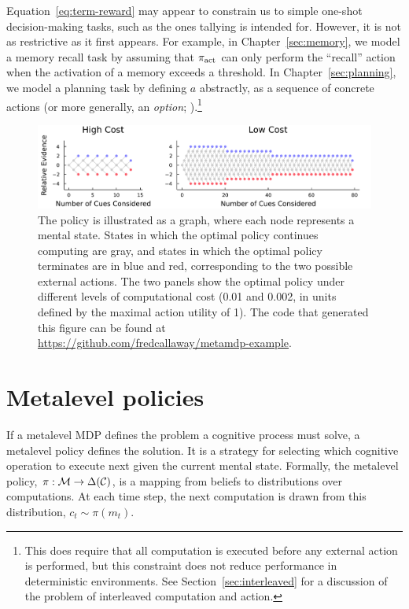 Equation~\ref{eq:term-reward} may appear to constrain us to simple one-shot decision-making tasks, such as the ones tallying is intended for. However, it is not as restrictive as it first appears. For example, in Chapter~\ref{sec:memory}, we model a memory recall task by assuming that $\pi_{\text{act}}$ can only perform the ``recall'' action when the activation of a memory exceeds a threshold. In Chapter~\ref{sec:planning}, we model a planning task by defining $a$ abstractly, as a sequence of concrete actions (or more generally, an \emph{option}; \citealp{sutton1999mdps}).\footnote{
  This does require that all computation is executed before any external action is performed, but this constraint does not reduce performance in deterministic environments. See Section~\ref{sec:interleaved} for a discussion of the problem of interleaved computation and action.
} 

\begin{figure}[tb!]
  \centering
  \includegraphics[width=\textwidth]{figs/policies.pdf}
  \caption{ 
    The policy is illustrated as a graph, where each node represents a mental state. States in which the optimal policy continues computing are gray, and states in which the optimal policy terminates are in blue and red, corresponding to the two possible external actions. The two panels show the optimal policy under different levels of computational cost (0.01 and 0.002, in units defined by the maximal action utility of 1). The code that generated this figure can be found at \url{https://github.com/fredcallaway/metamdp-example}.
  }
  \label{fig:tally-policies}
\end{figure}

\section{Metalevel policies}\label{sec:metamdp-policy}

If a metalevel MDP defines the problem a cognitive process must solve, a metalevel policy defines the solution. It is a strategy for selecting which cognitive operation to execute next given the current mental state. Formally, the metalevel policy, $\pi: \mathcal{M} \rightarrow \Delta(\mathcal{C})$, is a mapping from beliefs to distributions over computations. At each time step, the next computation is drawn from this distribution, $c_t \sim \pi(m_t)$.

